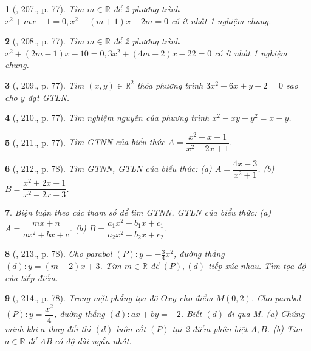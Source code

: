 \documentclass{article}
\newtheorem{baitoan}{}
\begin{document}
\begin{baitoan}[\cite{Tuyen_Toan_9_old}, 207., p. 77]
	Tìm $m\in\mathbb{R}$ để 2 phương trình $x^2 + mx + 1 = 0,x^2 - (m + 1)x - 2m = 0$ có ít nhất 1 nghiệm chung.
\end{baitoan}

\begin{baitoan}[\cite{Tuyen_Toan_9_old}, 208., p. 77]
	Tìm $m\in\mathbb{R}$ để 2 phương trình $x^2 + (2m - 1)x - 10 = 0,3x^2 + (4m - 2)x - 22 = 0$ có ít nhất 1 nghiệm chung.
\end{baitoan}

\begin{baitoan}[\cite{Tuyen_Toan_9_old}, 209., p. 77]
	Tìm $(x,y)\in\mathbb{R}^2$ thỏa phương trình $3x^2 - 6x + y - 2 = 0$ sao cho $y$ đạt {\rm GTLN}.
\end{baitoan}

\begin{baitoan}[\cite{Tuyen_Toan_9_old}, 210., p. 77]
	Tìm nghiệm nguyên của phương trình $x^2 - xy + y^2 = x - y$.
\end{baitoan}

\begin{baitoan}[\cite{Tuyen_Toan_9_old}, 211., p. 77]
	Tìm {\rm GTNN} của biểu thức $A = \dfrac{x^2 - x + 1}{x^2 - 2x + 1}$.
\end{baitoan}

\begin{baitoan}[\cite{Tuyen_Toan_9_old}, 212., p. 78]
	Tìm {\rm GTNN, GTLN} của biểu thức: (a) $A = \dfrac{4x - 3}{x^2 + 1}$. (b) $B = \dfrac{x^2 + 2x + 1}{x^2 - 2x + 3}$.
\end{baitoan}

\begin{baitoan}
	Biện luận theo các tham số để tìm {\rm GTNN, GTLN} của biểu thức: (a) $A = \dfrac{mx + n}{ax^2 + bx + c}$. (b) $B = \dfrac{a_1x^2 + b_1x + c_1}{a_2x^2 + b_2x + c_2}$.
\end{baitoan}

\begin{baitoan}[\cite{Tuyen_Toan_9_old}, 213., p. 78]
	Cho parabol $(P):y = -\frac{3}{4}x^2$, đường thẳng $(d):y = (m - 2)x + 3$. Tìm $m\in\mathbb{R}$ để $(P),(d)$ tiếp xúc nhau. Tìm tọa độ của tiếp điểm.
\end{baitoan}

\begin{baitoan}[\cite{Tuyen_Toan_9_old}, 214., p. 78]
	Trong mặt phẳng tọa độ $Oxy$ cho điểm $M(0,2)$. Cho parabol $(P):y = \dfrac{x^2}{4}$, đường thẳng $(d):ax + by = -2$. Biết $(d)$ đi qua M. (a) Chứng minh khi $a$ thay đổi thì $(d)$ luôn cắt $(P)$ tại 2 điểm phân biệt $A,B$. (b) Tìm $a\in\mathbb{R}$ để AB có độ dài ngắn nhất.
\end{baitoan}
\end{document}
